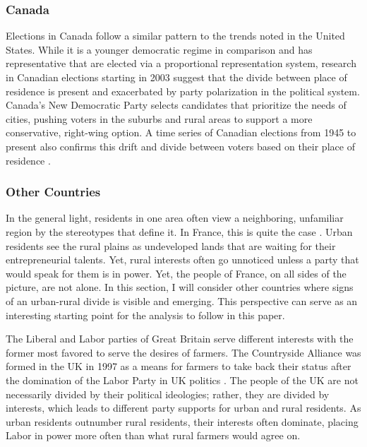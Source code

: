 \documentclass[12pt, titlepage]{article}
\begin{document}
\subsubsection{Canada}

Elections in Canada follow a similar pattern to the trends noted in the United States. While it is a younger democratic regime in comparison and has representative that are elected via a proportional representation system, research in Canadian elections starting in 2003 \citep{walks_place_2004} suggest that the divide between place of residence is present and exacerbated by party polarization in the political system. Canada's New Democratic Party selects candidates that prioritize the needs of cities, pushing voters in the suburbs and rural areas to support a more conservative, right-wing option. A time series of Canadian elections from 1945 to present also confirms this drift and divide between voters based on their place of residence \citep{walks_city-suburban_2005}. 

\subsubsection{Other Countries}

In the general light, residents in one area often view a neighboring, unfamiliar region by the stereotypes that define it. In France, this is quite the case \citep{clout_new_2003}. Urban residents see the rural plains as undeveloped lands that are waiting for their entrepreneurial talents. Yet, rural interests often go unnoticed unless a party that would speak for them is in power. Yet, the people of France, on all sides of the picture, are not alone. In this section, I will consider other countries where signs of an urban-rural divide is visible and emerging. This perspective can serve as an interesting starting point for the analysis to follow in this paper.

The Liberal and Labor parties of Great Britain serve different interests with the former most favored to serve the desires of farmers. The Countryside Alliance was formed in the UK in 1997 as a means for farmers to take back their status after the domination of the Labor Party in UK politics \citep{benton_ruralurban_2007}. The people of the UK are not necessarily divided by their political ideologies; rather, they are divided by interests, which leads to different party supports for urban and rural residents. As urban residents outnumber rural residents, their interests often dominate, placing Labor in power more often than what rural farmers would agree on.
\end{document}
